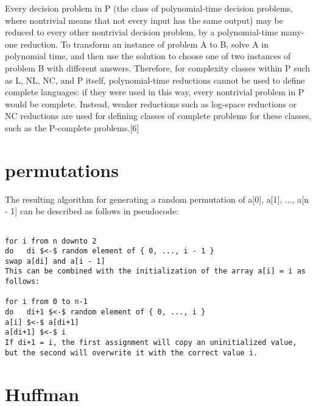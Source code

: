 \documentclass[10 pt]{article}
\begin{document}
Every decision problem in P (the class of polynomial-time decision problems, where nontrivial means that not every input has the same output) may be reduced to every other nontrivial decision problem, by a polynomial-time many-one reduction. To transform an instance of problem A to B, solve A in polynomial time, and then use the solution to choose one of two instances of problem B with different answers. Therefore, for complexity classes within P such as L, NL, NC, and P itself, polynomial-time reductions cannot be used to define complete languages: if they were used in this way, every nontrivial problem in P would be complete. Instead, weaker reductions such as log-space reductions or NC reductions are used for defining classes of complete problems for these classes, such as the P-complete problems.[6]

\section{permutations}
The resulting algorithm for generating a random permutation of a[0], a[1], ..., a[n - 1] can be described as follows in pseudocode:
\begin{verbatim}

for i from n downto 2
do   di $<-$ random element of { 0, ..., i - 1 }
swap a[di] and a[i - 1]
This can be combined with the initialization of the array a[i] = i as follows:

for i from 0 to n-1
do   di+1 $<-$ random element of { 0, ..., i }
a[i] $<-$ a[di+1]
a[di+1] $<-$ i
If di+1 = i, the first assignment will copy an uninitialized value, 
but the second will overwrite it with the correct value i.

\end{verbatim}

\section{Huffman}
\end{document}
